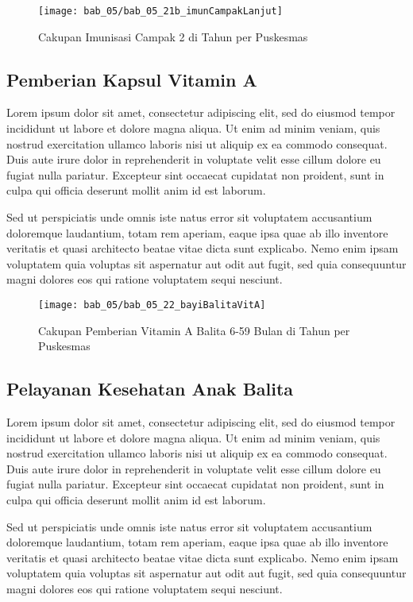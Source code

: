 \begin{figure}[H]
    \centering
    \texttt{[image: bab\_05/bab\_05\_21b\_imunCampakLanjut]}
    \caption{Cakupan Imunisasi Campak 2 di \namaKabupaten Tahun \tP per Puskesmas}
    \label{fig:Cakupan-Imunisasi-Campak2}
\end{figure}

\subsection{Pemberian Kapsul Vitamin A}
Lorem ipsum dolor sit amet, consectetur adipiscing elit, sed do eiusmod tempor incididunt ut labore et dolore magna aliqua. Ut enim ad minim veniam, quis nostrud exercitation ullamco laboris nisi ut aliquip ex ea commodo consequat. Duis aute irure dolor in reprehenderit in voluptate velit esse cillum dolore eu fugiat nulla pariatur. Excepteur sint occaecat cupidatat non proident, sunt in culpa qui officia deserunt mollit anim id est laborum.

Sed ut perspiciatis unde omnis iste natus error sit voluptatem accusantium doloremque laudantium, totam rem aperiam, eaque ipsa quae ab illo inventore veritatis et quasi architecto beatae vitae dicta sunt explicabo. Nemo enim ipsam voluptatem quia voluptas sit aspernatur aut odit aut fugit, sed quia consequuntur magni dolores eos qui ratione voluptatem sequi nesciunt.

\begin{figure}[H]
    \centering
    \texttt{[image: bab\_05/bab\_05\_22\_bayiBalitaVitA]}
    \caption{Cakupan Pemberian Vitamin A Balita 6-59 Bulan di \namaKabupaten Tahun \tP per Puskesmas}
    \label{fig:Cakupan-Vitamin-A-Balita}
\end{figure}

\subsection{Pelayanan Kesehatan Anak Balita}
Lorem ipsum dolor sit amet, consectetur adipiscing elit, sed do eiusmod tempor incididunt ut labore et dolore magna aliqua. Ut enim ad minim veniam, quis nostrud exercitation ullamco laboris nisi ut aliquip ex ea commodo consequat. Duis aute irure dolor in reprehenderit in voluptate velit esse cillum dolore eu fugiat nulla pariatur. Excepteur sint occaecat cupidatat non proident, sunt in culpa qui officia deserunt mollit anim id est laborum.

Sed ut perspiciatis unde omnis iste natus error sit voluptatem accusantium doloremque laudantium, totam rem aperiam, eaque ipsa quae ab illo inventore veritatis et quasi architecto beatae vitae dicta sunt explicabo. Nemo enim ipsam voluptatem quia voluptas sit aspernatur aut odit aut fugit, sed quia consequuntur magni dolores eos qui ratione voluptatem sequi nesciunt.

